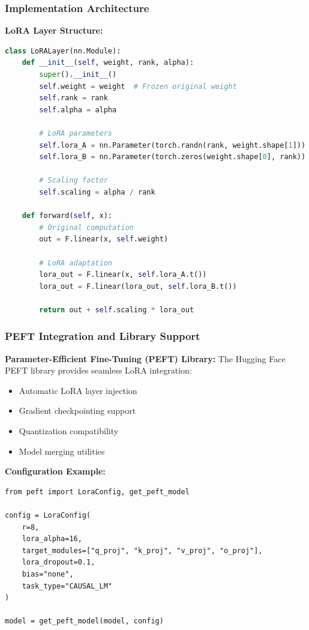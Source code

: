 \documentclass[conference]{IEEEtran}
\begin{document}
\subsubsection{Implementation Architecture}
\label{sec:q3_lora_implementation}

\textbf{LoRA Layer Structure:}
\begin{lstlisting}[language=Python]
class LoRALayer(nn.Module):
    def __init__(self, weight, rank, alpha):
        super().__init__()
        self.weight = weight  # Frozen original weight
        self.rank = rank
        self.alpha = alpha
        
        # LoRA parameters
        self.lora_A = nn.Parameter(torch.randn(rank, weight.shape[1]))
        self.lora_B = nn.Parameter(torch.zeros(weight.shape[0], rank))
        
        # Scaling factor
        self.scaling = alpha / rank
        
    def forward(self, x):
        # Original computation
        out = F.linear(x, self.weight)
        
        # LoRA adaptation
        lora_out = F.linear(x, self.lora_A.t())
        lora_out = F.linear(lora_out, self.lora_B.t())
        
        return out + self.scaling * lora_out
\end{lstlisting}

\subsubsection{PEFT Integration and Library Support}
\label{sec:q3_peft_integration}

\textbf{Parameter-Efficient Fine-Tuning (PEFT) Library:}
The Hugging Face PEFT library provides seamless LoRA integration:
\begin{itemize}
  \item Automatic LoRA layer injection
  \item Gradient checkpointing support
  \item Quantization compatibility
  \item Model merging utilities
\end{itemize}

\textbf{Configuration Example:}
\begin{lstlisting}
from peft import LoraConfig, get_peft_model

config = LoraConfig(
    r=8,
    lora_alpha=16,
    target_modules=["q_proj", "k_proj", "v_proj", "o_proj"],
    lora_dropout=0.1,
    bias="none",
    task_type="CAUSAL_LM"
)

model = get_peft_model(model, config)
\end{lstlisting}
\end{document}
